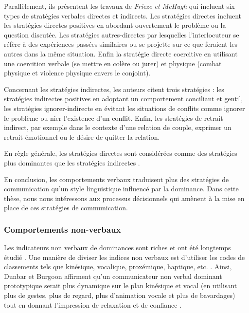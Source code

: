 			Parallèlement, ils présentent les travaux de \emph{Frieze et McHugh} \cite{frieze1992power} qui incluent six types de stratégies verbales directes et indirects. 
			Les stratégies directes incluent les stratégies	directes positives en abordant ouvertement le problème ou la question discutée. Les stratégies autres-directes par lesquelles l'interlocuteur se réfère à des expériences passées similaires ou se projette sur ce que feraient les autres dans la même situation. Enfin la stratégie directe coercitive en utilisant une coercition verbale (se mettre en colère ou jurer) et physique (combat physique et violence physique envers le conjoint). 
			
			Concernant les stratégies indirectes, les auteurs citent trois stratégies : les stratégies indirectes positives en adoptant un comportement conciliant et gentil, les stratégies ignorer-indirecte en évitant les situations de conflits comme ignorer le problème ou nier l'existence d'un conflit. Enfin, les stratégies de retrait indirect, par exemple dans le contexte d'une relation de couple, exprimer un retrait émotionnel ou le désire de quitter la relation. 
		
			En règle générale, les stratégies directes sont considérées comme des stratégies plus dominantes que les stratégies indirectes \cite{dunbar2005perceptions}.
			
			En conclusion, les comportements verbaux traduisent plus des stratégies de communication qu'un style linguistique influencé par la dominance. Dans cette thèse, nous nous intéressons aux processus décisionnels qui amènent à la mise en place de ces stratégies de communication. 
			
		\subsubsection{Comportements non-verbaux}
			Les indicateurs non verbaux de dominances sont riches et ont été longtemps étudié \cite{burgoon1995interpersonal,burgoon1998nature}. Une manière de diviser les indices non verbaux est d'utiliser les codes de classements tels que kinésique, vocalique, proxémique, haptique, etc. \cite{burgoon2006nonverbal}. Ainsi, Dunbar et Burgoon \cite{dunbar2005perceptions} affirment qu'un communicateur non verbal dominant prototypique serait plus dynamique sur le plan kinésique et vocal (en utilisant plus de gestes, plus de regard, plus d'animation vocale et plus de bavardages) tout en donnant l'impression de relaxation et de confiance .
			
